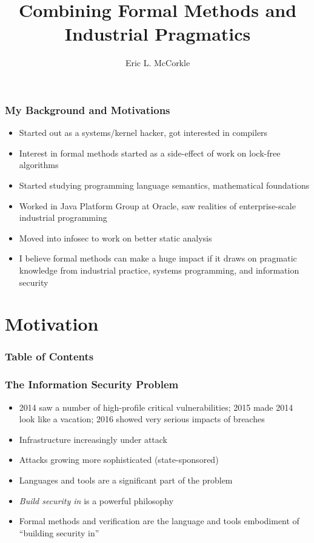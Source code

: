 \documentclass{beamer}
\title{Combining Formal Methods and Industrial Pragmatics}
\author{Eric L. McCorkle}
\begin{document}
\begin{frame}
  \titlepage
\end{frame}

\begin{frame}
  \frametitle{My Background and Motivations}
  \begin{itemize}
    \item Started out as a systems/kernel hacker, got interested in
      compilers
    \item Interest in formal methods started as a side-effect of work on
      lock-free algorithms
    \item Started studying programming language semantics,
      mathematical foundations
    \item Worked in Java Platform Group at Oracle, saw realities of
      enterprise-scale industrial programming
    \item Moved into infosec to work on better static analysis
    \item I believe formal methods can make a huge impact if it draws
      on pragmatic knowledge from industrial practice, systems
      programming, and information security
  \end{itemize}
\end{frame}

\section{Motivation}

\begin{frame}
  \frametitle{Table of Contents}
  \tableofcontents[currentsection]
\end{frame}

\begin{frame}
  \frametitle{The Information Security Problem}
  \begin{itemize}
    \item 2014 saw a number of high-profile critical vulnerabilities;
      2015 made 2014 look like a vacation; 2016 showed very serious
      impacts of breaches
    \item Infrastructure increasingly under attack
    \item Attacks growing more sophisticated (state-sponsored)
    \item Languages and tools are a significant part of the problem
    \item \emph{Build security in} is a powerful philosophy
    \item Formal methods and verification are the language and tools
      embodiment of ``building security in''
  \end{itemize}
\end{frame}
\end{document}
